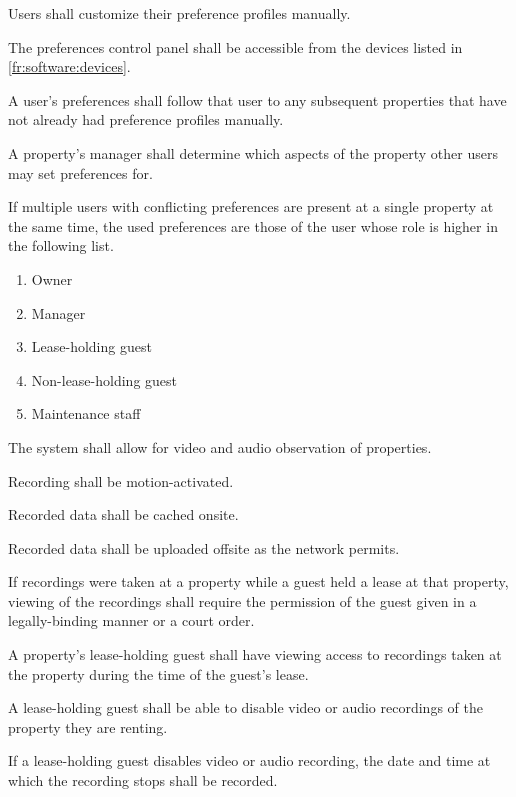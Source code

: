 \documentclass[letter,titlepage,oneside,english]{report}
\begin{document}
\begin{fr}
\begin{fr}
    Users shall customize their preference profiles manually.
  \item
    The preferences control panel shall be accessible from the devices listed in \ref{fr:software:devices}.
  \item
    A user's preferences shall follow that user to any subsequent properties that have not already had preference profiles manually.
  \item
    A property's manager shall determine which aspects of the property other users may set preferences for.
  \item
    If multiple users with conflicting preferences are present at a single property at the same time, the used preferences are those of the user whose role is higher in the following list.
    \begin{enumerate}
    \item
      Owner
    \item
      Manager
    \item
      Lease-holding guest
    \item
      Non-lease-holding guest
    \item
      Maintenance staff
    \end{enumerate}
  \end{fr}
\item
  The system shall allow for video and audio observation of properties.
  \begin{fr}
  \item
    Recording shall be motion-activated.
  \item
    Recorded data shall be cached onsite.
  \item
    Recorded data shall be uploaded offsite as the network permits.
  \item
    If recordings were taken at a property while a guest held a lease at that property, viewing of the recordings shall require the permission of the guest given in a legally-binding manner or a court order.
  \item
    A property's lease-holding guest shall have viewing access to recordings taken at the property during the time of the guest's lease.
  \item
    A lease-holding guest shall be able to disable video or audio recordings of the property they are renting.
    \begin{fr}
    \item
      If a lease-holding guest disables video or audio recording, the date and time at which the recording stops shall be recorded.

\end{fr}
\end{fr}
\end{fr}
\end{document}
